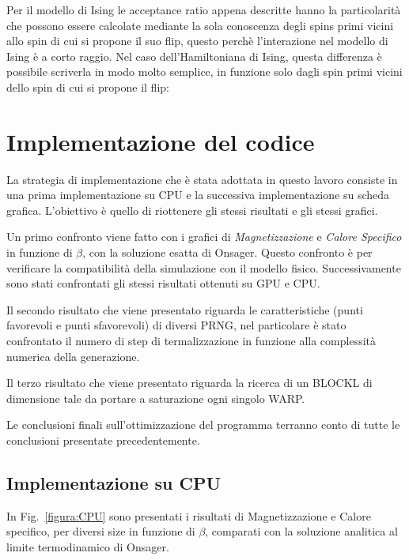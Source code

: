 \documentclass[a4paper,12pt]{article}
\begin{document}
Per il modello di Ising le acceptance ratio appena descritte hanno la particolarità che possono essere calcolate mediante la sola conoscenza degli spins primi vicini allo spin di cui si propone il suo flip, questo perchè l'interazione nel modello di Ising  è a corto raggio. Nel caso dell'Hamiltoniana di Ising, questa differenza è possibile scriverla in modo molto semplice, in funzione solo dagli spin primi vicini dello spin di cui si propone il flip:



\section{Implementazione del codice}
La strategia di implementazione che \`e stata adottata in questo lavoro consiste in una prima implementazione su CPU e la successiva implementazione su scheda grafica. L'obiettivo \`e quello di riottenere gli stessi risultati e gli stessi grafici. 

Un primo confronto viene fatto con i grafici di \emph{Magnetizzazione} e \emph{Calore Specifico} in funzione di $\beta$, con la soluzione esatta di Onsager. Questo confronto \`e per verificare la compatibilit\`a della simulazione con il modello fisico. Successivamente sono stati confrontati gli stessi risultati ottenuti su GPU e CPU. 

Il secondo risultato che viene presentato riguarda le caratteristiche (punti favorevoli e punti sfavorevoli) di diversi PRNG, nel particolare \`e stato confrontato il numero di step di termalizzazione in funzione alla complessit\`a numerica della generazione. 

Il terzo risultato che viene presentato riguarda la ricerca di un BLOCKL di dimensione tale da portare a saturazione ogni singolo WARP.

Le conclusioni finali sull'ottimizzazione del programma terranno conto di tutte le conclusioni presentate precedentemente.

\subsection{Implementazione su CPU}
In Fig.~\ref{figura:CPU} sono presentati i risultati di Magnetizzazione e Calore specifico, per diversi size in funzione di $\beta$, comparati con la soluzione analitica al limite termodinamico di Onsager.
\end{document}
